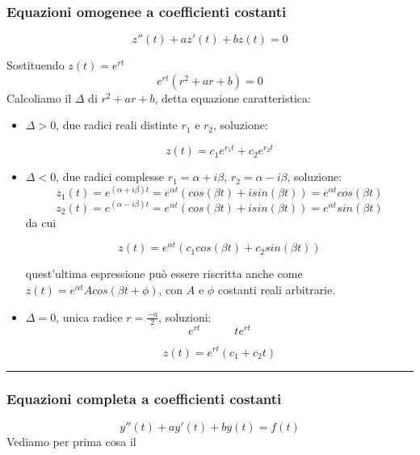 \subsubsection*{Equazioni omogenee a coefficienti costanti}
\begin{tcolorbox}
\[
    z''(t) + a z'(t) + bz(t) = 0
\]
\end{tcolorbox}
Sostituendo $z(t) = e^{rt}$
\[
    e^{rt}(r^2 + a r + b) = 0
\]
Calcoliamo il $\Delta$ di $r^2 + a r + b$, detta equazione caratteristica:
\begin{itemize}
    \item $\Delta>0$, due radici reali distinte $r_1$ e $r_2$, soluzione:
    \begin{tcolorbox}
    \[
        z(t) = c_1e^{r_1t} + c_2e^{r_2t}
    \]
    \end{tcolorbox}
    \item $\Delta <0$, due radici complesse $r_1 =\alpha + i \beta$, $r_2 = \alpha - i \beta$, soluzione:
    \[
        z_1(t) = e^{(\alpha + i \beta)t} =e^{\alpha t} (cos(\beta t) + i sin(\beta t)) = e^{\alpha t} cos(\beta t)
    \]
    \[
        z_2(t) = e^{(\alpha-i \beta)t} = e^{\alpha t}(cos(\beta t) + i sin(\beta t)) = e^{\alpha t} sin (\beta t)
    \]
    da cui
    \begin{tcolorbox}
    \[
        z(t) = e^{\alpha t}(c_1 cos(\beta t) + c_2 sin (\beta t))
    \]
    \end{tcolorbox}
    quest'ultima espressione può essere riscritta anche come $z(t) = e^{\alpha t} A cos(\beta t + \phi)$, con $A$ e $\phi$ costanti reali arbitrarie.
    \item $\Delta = 0$, unica radice $r=\frac{-a}{2}$, soluzioni:
    \[
        e^{rt} \quad \quad \quad te^{rt}
    \] 
    \begin{tcolorbox}
    \[
        z(t) = e^{rt}(c_1 + c_2 t)
    \]
    \end{tcolorbox}
\end{itemize}
\rule{\textwidth}{0,4pt}
\subsubsection*{Equazioni completa a coefficienti costanti}
\[
    y''(t) + a y'(t) + b y(t) = f(t)
\]
Vediamo per prima cosa il 
